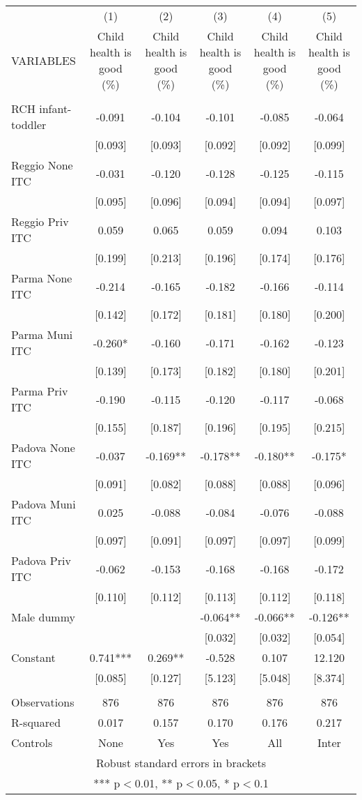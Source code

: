 \begin{tabular}{lccccc} \hline
 & (1) & (2) & (3) & (4) & (5) \\
VARIABLES & Child health is good (\%) & Child health is good (\%) & Child health is good (\%) & Child health is good (\%) & Child health is good (\%) \\ \hline
 &  &  &  &  &  \\
RCH infant-toddler & -0.091 & -0.104 & -0.101 & -0.085 & -0.064 \\
 & [0.093] & [0.093] & [0.092] & [0.092] & [0.099] \\
Reggio None ITC & -0.031 & -0.120 & -0.128 & -0.125 & -0.115 \\
 & [0.095] & [0.096] & [0.094] & [0.094] & [0.097] \\
Reggio Priv ITC & 0.059 & 0.065 & 0.059 & 0.094 & 0.103 \\
 & [0.199] & [0.213] & [0.196] & [0.174] & [0.176] \\
Parma None ITC & -0.214 & -0.165 & -0.182 & -0.166 & -0.114 \\
 & [0.142] & [0.172] & [0.181] & [0.180] & [0.200] \\
Parma Muni ITC & -0.260* & -0.160 & -0.171 & -0.162 & -0.123 \\
 & [0.139] & [0.173] & [0.182] & [0.180] & [0.201] \\
Parma Priv ITC & -0.190 & -0.115 & -0.120 & -0.117 & -0.068 \\
 & [0.155] & [0.187] & [0.196] & [0.195] & [0.215] \\
Padova None ITC & -0.037 & -0.169** & -0.178** & -0.180** & -0.175* \\
 & [0.091] & [0.082] & [0.088] & [0.088] & [0.096] \\
Padova Muni ITC & 0.025 & -0.088 & -0.084 & -0.076 & -0.088 \\
 & [0.097] & [0.091] & [0.097] & [0.097] & [0.099] \\
Padova Priv ITC & -0.062 & -0.153 & -0.168 & -0.168 & -0.172 \\
 & [0.110] & [0.112] & [0.113] & [0.112] & [0.118] \\
Male dummy &  &  & -0.064** & -0.066** & -0.126** \\
 &  &  & [0.032] & [0.032] & [0.054] \\
Constant & 0.741*** & 0.269** & -0.528 & 0.107 & 12.120 \\
 & [0.085] & [0.127] & [5.123] & [5.048] & [8.374] \\
 &  &  &  &  &  \\
Observations & 876 & 876 & 876 & 876 & 876 \\
R-squared & 0.017 & 0.157 & 0.170 & 0.176 & 0.217 \\
 Controls & None & Yes & Yes & All & Inter \\ \hline
\multicolumn{6}{c}{ Robust standard errors in brackets} \\
\multicolumn{6}{c}{ *** p$<$0.01, ** p$<$0.05, * p$<$0.1} \\
\end{tabular}
